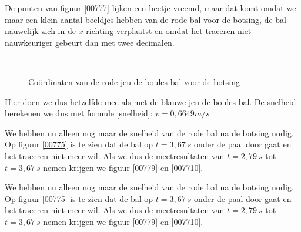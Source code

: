 \documentclass[12pt,a4paper]{article}
\begin{document}
	De punten van figuur \ref{00777} lijken een beetje vreemd, maar dat komt omdat we maar een klein aantal beeldjes hebben van de rode bal voor de botsing, de bal nauwelijk zich in de $x$-richting verplaatst en omdat het traceren niet nauwkeuriger gebeurt dan met twee decimalen.

	\begin{figure}[H]
		\centering
		\,
		
		\caption{Co\"{o}rdinaten van de rode jeu de boules-bal voor de botsing}
	\end{figure}
	
	Hier doen we dus hetzelfde mee als met de blauwe jeu de boules-bal. De snelheid berekenen we dus met formule \eqref{snelheid}: $v=0,6649m/s$

	We hebben nu alleen nog maar de snelheid van de rode bal na de botsing nodig. Op figuur \ref{00775} is te zien dat de bal op $t=3,67\ s$ onder de paal door gaat en het traceren niet meer wil. Als we dus de meetresultaten van $t=2,79\ s$ tot $t=3,67\ s$ nemen krijgen we figuur \ref{00779} en \ref{007710}.

	We hebben nu alleen nog maar de snelheid van de rode bal na de botsing nodig. Op figuur \ref{00775} is te zien dat de bal op $t=3,67\ s$ onder de paal door gaat en het traceren niet meer wil. Als we dus de meetresultaten van $t=2,79\ s$ tot $t=3,67\ s$ nemen krijgen we figuur \ref{00779} en \ref{007710}.
\end{document}
